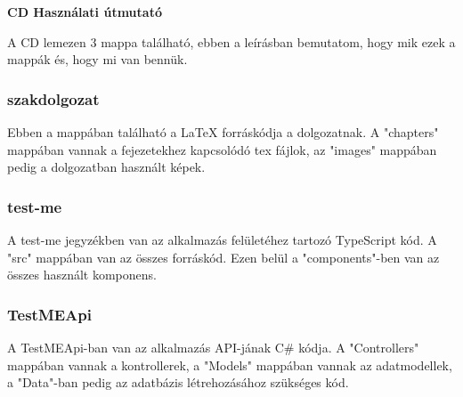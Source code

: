 \pagestyle{empty}

\noindent \textbf{\Large CD Használati útmutató}

\vskip 1cm

A CD lemezen 3 mappa található, ebben a leírásban bemutatom, hogy mik ezek a mappák és, hogy mi van bennük.

\subsubsection{szakdolgozat}

Ebben a mappában található a LaTeX forráskódja a dolgozatnak. A "chapters" mappában vannak a fejezetekhez kapcsolódó tex fájlok, az "images" mappában pedig a dolgozatban használt képek.

\subsubsection{test-me}
A test-me jegyzékben van az alkalmazás felületéhez tartozó TypeScript kód.
A "src" mappában van az összes forráskód. Ezen belül a "components"-ben van az összes használt komponens.

\subsubsection{TestMEApi}
A TestMEApi-ban van az alkalmazás API-jának C\# kódja. A "Controllers" mappában vannak a kontrollerek, a "Models" mappában vannak az adatmodellek, a "Data"-ban pedig az adatbázis létrehozásához szükséges kód.
